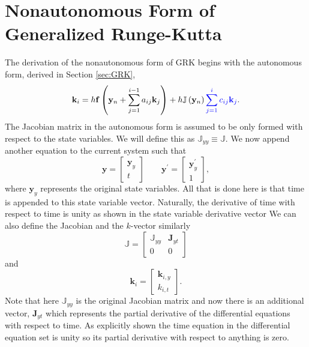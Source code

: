 \documentclass{ansconf}
\numberwithin{equation}{section}
\begin{document}
\section{Nonautonomous Form of Generalized Runge-Kutta} \label{app:GRK_nonauto}
The derivation of the nonautonomous form of GRK begins with the autonomous form, derived in Section \ref{sec:GRK},
\begin{equation}
     \mathbf{k}_i = h\mathbf{f}\left(\mathbf{y}_n + \sum_{j=1}^{i-1}a_{ij}\mathbf{k}_j\right) +     
     h\mathbb{J}\left(\mathbf{y}_n\right) {\color{blue}\sum_{j=1}^{i}c_{ij}\mathbf{k}_j}.
\end{equation}
The Jacobian matrix in the autonomous form is assumed to be only formed with respect to the state variables. We will define this as $\mathbb{J}_{yy} \equiv \mathbb{J}$. We now append another equation to the current system such that
\begin{equation}
    \mathbf{y} = \left[ \begin{array}{c}
    \mathbf{y}_y \\
    t
    \end{array} \right ] \qquad
     \mathbf{y}^\prime = \left[ \begin{array}{c}
    \mathbf{y}_y^\prime \\
    1
    \end{array} \right ],
\end{equation}
where $\mathbf{y}_y$ represents the original state variables. All that is done here is that time is appended to this state variable vector. Naturally, the derivative of time with respect to time is unity as shown in the state variable derivative vector
We can also define the Jacobian and the $k$-vector similarly
  \begin{equation}
    \mathbb{J} = \left[ \begin{array}{cc}
    \mathbb{J}_{yy} & \mathbf{J}_{yt} \\
    0 & 0
    \end{array} \right]
  \end{equation}
  and
  \begin{equation}
    \mathbf{k}_i = \left[ \begin{array}{c}
    \mathbf{k}_{i,y} \\
    k_{i,t}
    \end{array} \right ].
  \end{equation}
Note that here $\mathbb{J}_{yy}$ is the original Jacobian matrix and now there is an additional vector, $\mathbf{J}_{yt}$ which represents the partial derivative of the differential equations with respect to time. As explicitly shown the time equation in the differential equation set is unity so its partial derivative with respect to anything is zero.
\end{document}
